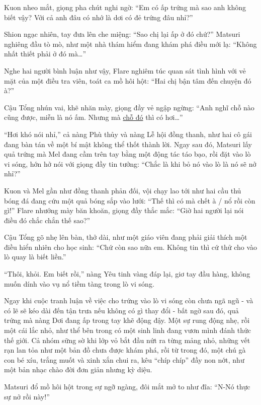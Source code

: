 \documentclass[../main.tex]{subfiles}
\begin{document}
Kuon nheo mắt, giọng pha chút nghi ngờ: ``Em có ấp trứng mà sao anh không biết vậy? Với cả anh đâu có nhớ là dơi có đẻ trứng đâu nhỉ?''

Shion ngạc nhiên, tay đưa lên che miệng: ``Sao chị lại ấp ở đó chứ?'' Matsuri nghiêng đầu tò mò, như một nhà thám hiểm đang khám phá điều mới lạ: ``Không nhất thiết phải ở đó mà\dots''

Nghe hai người bình luận như vậy, Flare nghiêm túc quan sát tình hình với vẻ mặt của một điều tra viên, toát ca mồ hôi hột: ``Hai chị bận tâm đến chuyện đó à?''

Cậu Tổng nhún vai, khẽ nhăn mày, giọng đầy vẻ ngập ngừng: ``Anh nghĩ chỗ nào cũng được, miễn là nó ấm. Nhưng mà \uline{chỗ đó} thì có hơi\dots''

``Hơi khó nói nhỉ,'' cả nàng Phù thủy và nàng Lễ hội đồng thanh, như hai cô gái đang bàn tán về một bí mật không thể thốt thành lời. Ngay sau đó, Matsuri lấy quả trứng mà Mel đang cầm trên tay bằng một động tác táo bạo, rồi đặt vào lò vi sóng, hớn hở nói với giọng đầy tin tưởng: ``Chắc là khi bỏ nó vào lò là nó sẽ nở nhỉ?''


Kuon và Mel gần như đồng thanh phản đối, vội chạy lao tới như hai cầu thủ bóng đá đang cứu một quả bóng sắp vào lưới: ``Thế thì có mà chết à / nổ rồi còn gì!'' Flare nhướng mày băn khoăn, giọng đầy thắc mắc: ``Giờ hai người lại nói điều đó chắc chắn thế sao?''

Cậu Tổng gõ nhẹ lên bàn, thở dài, như một giáo viên đang phải giải thích một điều hiển nhiên cho học sinh: ``Chứ còn sao nữa em. Không tin thì cứ thử cho vào lò quay là biết liền.''

``Thôi, khỏi. Em biết rồi,'' nàng Yêu tinh vàng đáp lại, giơ tay đầu hàng, không muốn dính vào vụ nổ tiềm tàng trong lò vi sóng.

Ngay khi cuộc tranh luận về việc cho trứng vào lò vi sóng còn chưa ngã ngũ - và có lẽ sẽ kéo dài đến tận trưa nếu không có gì thay đổi - bất ngờ sau đó, quả trứng mà nàng Dơi đang ấp trong tay khẽ động đậy. Một sự rung động nhẹ, rồi một cái lắc nhỏ, như thể bên trong có một sinh linh đang vươn mình đánh thức thế giới. Cả nhóm sững sờ khi lớp vỏ bắt đầu nứt ra từng mảng nhỏ, những vết rạn lan tỏa như một bản đồ chưa được khám phá, rồi từ trong đó, một chú gà con bé xíu, trắng muốt và xinh xắn chui ra, kêu ``chíp chíp'' đầy non nớt, như một bản nhạc chào đời đơn giản nhưng kỳ diệu.


Matsuri đổ mồ hôi hột trong sự ngỡ ngàng, đôi mắt mở to như đĩa: ``N-Nó thực sự nở rồi này!''
\end{document}
